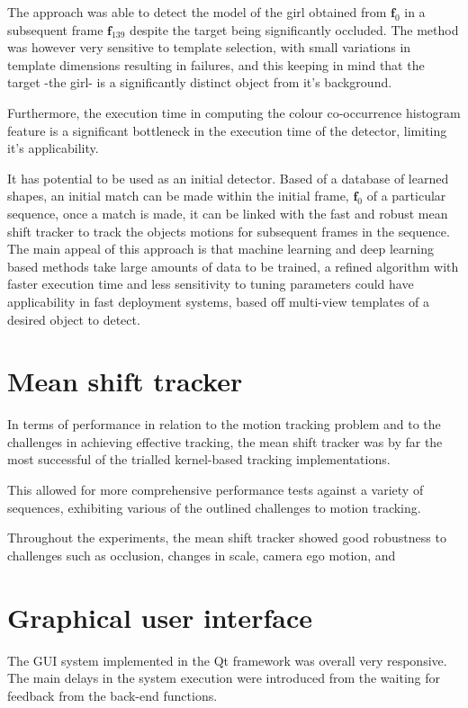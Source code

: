 The approach was able to detect the model of the girl obtained from
$\mathbf{f}_0$ in a subsequent frame $\mathbf{f}_{139}$ despite the target being
significantly occluded. 
The method was however very sensitive to template selection, with small
variations in template dimensions resulting in failures, and this keeping in
mind that the target -the girl- is a significantly distinct object from it's
background. 

Furthermore, the execution time in computing the colour co-occurrence histogram
feature is a significant bottleneck in the execution time of the detector,
limiting it's applicability. 

It has potential to be used as an initial detector. Based of a database of
learned shapes, an initial match can be made within the initial frame,
$\mathbf{f}_0$ of a particular sequence, once a match is made, it can be linked
with the fast and robust mean shift tracker to track the objects motions for
subsequent frames in the sequence. 
The main appeal of this approach is that machine learning and deep learning
based methods take large amounts of data to be trained, a refined algorithm with
faster execution time and less sensitivity to tuning parameters could have
applicability in fast deployment systems, based off multi-view templates of a
desired object to detect.

\section{Mean shift tracker}
In terms of performance in relation to the motion tracking problem and to the
challenges in achieving effective tracking, the mean shift tracker was by far
the most successful of the trialled kernel-based tracking implementations.

This allowed for more comprehensive performance tests against a variety of
sequences, exhibiting various of the outlined challenges to motion tracking.

Throughout the experiments, the mean shift tracker showed good robustness to
challenges such as occlusion, changes in scale, camera ego motion, and  


\section{Graphical user interface}
The GUI system implemented in the Qt framework was overall very responsive. The
main delays in the system execution were introduced from the waiting for
feedback from the back-end functions.

